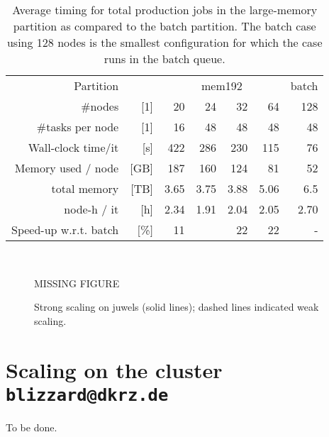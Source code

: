 \begin{table}
  \caption{Average timing for total production jobs in the large-memory partition as compared to the batch partition.
  The batch case using 128 nodes is the smallest configuration for which the case runs in the batch queue. }
  \begin{centering}{\footnotesize\begin{tabular}{rrr|r|rrr}
    \toprule
    Partition               && \multicolumn{4}{c}{mem192}&batch\\
    \#nodes                 &[1]&    20  &  24  &  32 &  64 & 128\\
    \midrule
    \rowcolor{gray!20}\#tasks per node        &[1]&    16  &  48  &  48 &  48 &  48\\
    Wall-clock time/it &[s]      &    422 &  286 & 230 & 115 & 76 \\
    \rowcolor{gray!20} Memory used / node& [GB] &    187 &  160 & 124 &  81 & 52 \\
    total memory & [TB]       &    3.65&  3.75& 3.88& 5.06& 6.5\\
    \rowcolor{gray!20}node-h / it & [h]             &    2.34& 1.91 & 2.04& 2.05& 2.70\\
    \midrule
    Speed-up w.r.t. batch & $[$\%$]$  &    11& \cellcolor{green!62}{\textbf{31}}&22&22&  -\\
    \midrule\bottomrule

  \end{tabular}}\\\end{centering}
  \label{tab:memory_juwels}
\end{table}


\begin{figure}
  MISSING FIGURE
  \caption{Strong scaling on juwels (solid lines); dashed lines indicated weak scaling.}
  \label{fig:scaling_juwels}
\end{figure}

\section{Scaling on the cluster \texttt{blizzard@dkrz.de}}

To be done.

